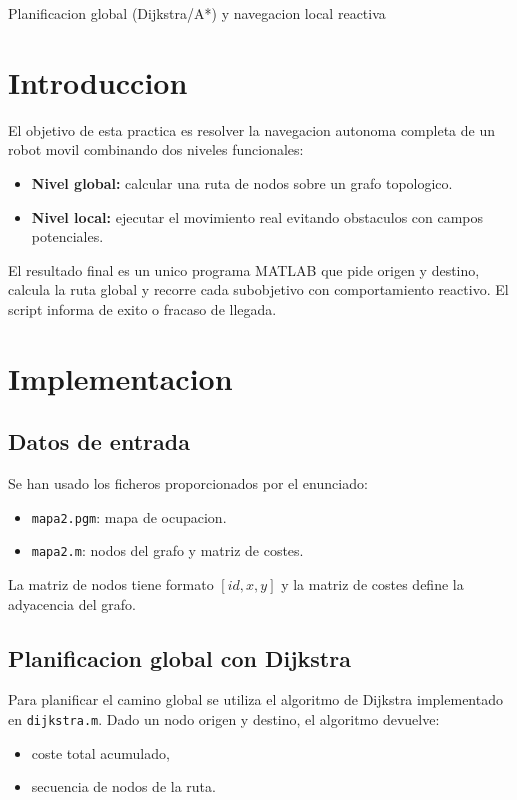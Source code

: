 \documentclass[12pt]{article}
\begin{document}
%
        {Planificacion global (Dijkstra/A*) y navegacion local reactiva}

\tableofcontents
\clearpage

\section{Introduccion}

El objetivo de esta practica es resolver la navegacion autonoma completa de un robot movil combinando dos niveles funcionales:
\begin{itemize}[leftmargin=2em]
  \item \textbf{Nivel global:} calcular una ruta de nodos sobre un grafo topologico.
  \item \textbf{Nivel local:} ejecutar el movimiento real evitando obstaculos con campos potenciales.
\end{itemize}

El resultado final es un unico programa MATLAB que pide origen y destino, calcula la ruta global y recorre cada subobjetivo con comportamiento reactivo. El script informa de exito o fracaso de llegada.

\section{Implementacion}

\subsection{Datos de entrada}
Se han usado los ficheros proporcionados por el enunciado:
\begin{itemize}[leftmargin=2em]
  \item \texttt{mapa2.pgm}: mapa de ocupacion.
  \item \texttt{mapa2.m}: nodos del grafo y matriz de costes.
\end{itemize}

La matriz de nodos tiene formato $[id, x, y]$ y la matriz de costes define la adyacencia del grafo.

\subsection{Planificacion global con Dijkstra}
Para planificar el camino global se utiliza el algoritmo de Dijkstra implementado en \texttt{dijkstra.m}. Dado un nodo origen y destino, el algoritmo devuelve:
\begin{itemize}[leftmargin=2em]
  \item coste total acumulado,
  \item secuencia de nodos de la ruta.
\end{itemize}
\end{document}
